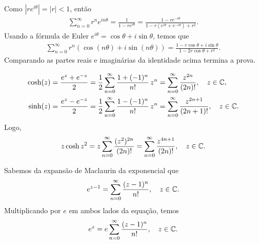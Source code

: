\begin{questions}
%
\begin{solution}
    Como $|re^{i\theta}| = |r| < 1$, então
    \begin{align*}
        \sum_{n=0}^\infty r^n e^{i n\theta} = \frac{1}{1-re^{i\theta}} = \frac{1-r e^{-i\theta}}{1 - r(e^{i\theta}+e^{-i\theta}) + r^2}.
    \end{align*}
    Usando a fórmula de Euler $e^{i\theta} = \cos\theta + i\sin\theta$, temos que
    \begin{align*}
        \sum_{n=0}^\infty r^n(\cos(n\theta) + i\sin(n\theta))
            = \frac{1-r\cos\theta + i \sin\theta}{1 - 2r\cos\theta + r^2}.
    \end{align*}
    Comparando as partes reais e imaginárias da identidade acima termina a prova.
\end{solution}


\setcounter{question}{8}
%
\begin{solution}
    \begin{align*}
        \cosh(z) 
            &= \frac{e^z+e^{-z}}{2} = \frac{1}{2} \sum_{n=0}^\infty \frac{1+(-1)^n}{n!}\,z^n = \sum_{n=0}^\infty \frac{z^{2n}}{(2n)!},\quad z\in{\mathbb C},\\
        \sinh(z) 
            &= \frac{e^z-e^{-z}}{2} = \frac{1}{2} \sum_{n=0}^\infty \frac{1-(-1)^n}{n!}\,z^n = \sum_{n=0}^\infty \frac{z^{2n+1}}{(2n+1)!},\quad z\in{\mathbb C}.
    \end{align*}
    Logo,
    \begin{align*}
        z\cosh z^2 = z \sum_{n=0}^\infty\frac{(z^2)^{2n}}{(2n)!}
            = \sum_{n=0}^\infty\frac{z^{4n+1}}{(2n)!}, \quad z\in{\mathbb C}.
    \end{align*}
\end{solution}

%
\begin{solution}
Sabemos da expansão de Maclaurin da exponencial que
    \begin{align*}
        e^{z-1} = \sum_{n=0}^\infty \frac{(z-1)^n}{n!}, \quad z\in{\mathbb C}.
    \end{align*}
    Multiplicando por $e$ em ambos lados da equação, temos
    \begin{align*}
        e^z = e \sum_{n=0}^\infty \frac{(z-1)^n}{n!}, \quad z\in{\mathbb C}.
    \end{align*}
\end{solution}


\end{questions}
